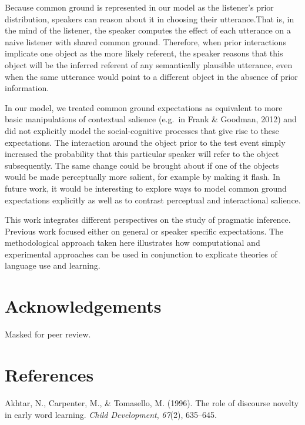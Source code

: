 \documentclass[10pt, letterpaper]{article}
\begin{document}
Because common ground is represented in our model as the listener's
prior distribution, speakers can reason about it in choosing their
utterance.That is, in the mind of the listener, the speaker computes the
effect of each utterance on a naive listener with shared common ground.
Therefore, when prior interactions implicate one object as the more
likely referent, the speaker reasons that this object will be the
inferred referent of any semantically plausible utterance, even when the
same utterance would point to a different object in the absence of prior
information.

In our model, we treated common ground expectations as equivalent to
more basic manipulations of contextual salience (e.g.~in Frank \&
Goodman, 2012) and did not explicitly model the social-cognitive
processes that give rise to these expectations. The interaction around
the object prior to the test event simply increased the probability that
this particular speaker will refer to the object subsequently. The same
change could be brought about if one of the objects would be made
perceptually more salient, for example by making it flash. In future
work, it would be interesting to explore ways to model common ground
expectations explicitly as well as to contrast perceptual and
interactional salience.

This work integrates different perspectives on the study of pragmatic
inference. Previous work focused either on general or speaker specific
expectations. The methodological approach taken here illustrates how
computational and experimental approaches can be used in conjunction to
explicate theories of language use and learning.

\section{Acknowledgements}\label{acknowledgements}

Masked for peer review.

\section{References}\label{references}

\setlength{\parindent}{-0.1in} \setlength{\leftskip}{0.125in} \noindent

\hypertarget{refs}{}
\hypertarget{ref-akhtar1996role}{}
Akhtar, N., Carpenter, M., \& Tomasello, M. (1996). The role of
discourse novelty in early word learning. \emph{Child Development},
\emph{67}(2), 635--645.
\end{document}
